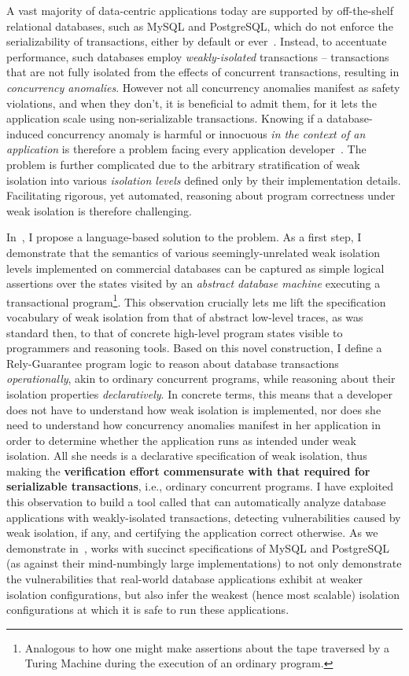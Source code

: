 A vast majority of data-centric applications today are supported by
off-the-shelf relational databases, such as MySQL and PostgreSQL,
which do not enforce the serializability of transactions, either by
default or ever~\cite{bailishotos,bailisblog1}. Instead, to accentuate
performance, such databases employ \emph{weakly-isolated} transactions
-- transactions that are not fully isolated from the effects of
concurrent transactions, resulting in \emph{concurrency anomalies}.
However not all concurrency anomalies manifest as safety violations,
and when they don't, it is beneficial to admit them, for it lets the
application scale using non-serializable transactions. Knowing if a
database-induced concurrency anomaly is harmful or innocuous \emph{in
the context of an application} is therefore a problem facing every
application developer~\cite{bailisblog2}. The problem is further
complicated due to the arbitrary stratification of weak isolation into
various \emph{isolation levels} defined only by their implementation
details.  Facilitating rigorous, yet automated, reasoning about
program correctness under weak isolation is therefore challenging. 

In~\cite{popl18}, I propose a language-based solution to the problem.
As a first step, I demonstrate that the semantics of various
seemingly-unrelated weak isolation levels implemented on commercial
databases can be captured as simple logical assertions over the states
visited by an \emph{abstract database machine} executing a
transactional program\footnote{Analogous to how one might make
  assertions about the tape traversed by a Turing Machine during the
  execution of an ordinary program.}. This observation crucially lets 
me lift the specification vocabulary of weak isolation from that of
abstract low-level traces, as was standard then, to that of concrete
high-level program states visible to programmers and reasoning tools.
Based on this novel construction, I define a Rely-Guarantee program
logic to reason about database transactions \emph{operationally}, akin
to ordinary concurrent programs, while reasoning about their isolation
properties \emph{declaratively}. In concrete terms, this means that a
developer does not have to understand how weak isolation is
implemented, nor does she need to understand how concurrency anomalies
manifest in her application in order to determine whether the
application runs as intended under weak isolation. All she needs is a
declarative specification of weak isolation, thus making the
\textbf{verification effort commensurate with that required for
serializable transactions}, i.e., ordinary concurrent programs. I have
exploited this observation to build a tool called \acidifier that can
automatically analyze database applications with weakly-isolated
transactions, detecting vulnerabilities caused by weak isolation, if
any, and certifying the application correct otherwise. As we
demonstrate in~\cite{popl18}, \acidifier works with succinct
specifications of MySQL and PostgreSQL (as against their
mind-numbingly large implementations) to not only demonstrate the
vulnerabilities that real-world database applications exhibit at
weaker isolation configurations, but also infer the weakest (hence
most scalable) isolation configurations at which it is safe to run
these applications.

